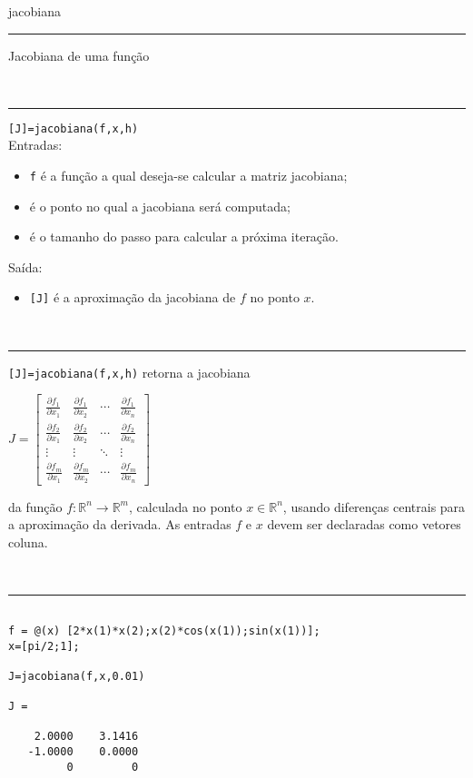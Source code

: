 \documentclass[12pt,a4paper]{article}%
\newcommand{\comando}[1]{{\Large #1} \\ \noindent\rule {17.9cm}{0.05cm}}
\newcommand{\parte}[1]{\vspace{1cm}{\large #1} \\ \noindent\rule {17.9cm}{0.05cm}}
\begin{document}
\comando{jacobiana}

Jacobiana de uma função

\parte{Sintaxe}

\texttt{[J]=jacobiana(f,x,h)}\\

Entradas:

\begin{itemize}
\item \texttt{f} é a função a qual deseja-se calcular a matriz jacobiana;
\item {} é o ponto no qual a jacobiana será computada;
\item {} é o tamanho do passo para calcular a próxima iteração.
\end{itemize}

Saída:

\begin{itemize}
\item \texttt{[J]} é a aproximação da jacobiana de $f$ no ponto $x$. 
\end{itemize}


\parte{Descrição}

\texttt{[J]=jacobiana(f,x,h)} retorna a jacobiana
\begin{center}
$J=%
\begin{bmatrix}
\frac{\partial f_{1}}{\partial x_{1}} & \frac{\partial f_{1}}{\partial x_{2}}
& \cdots  & \frac{\partial f_{1}}{\partial x_{n}} \\ 
\frac{\partial f_{2}}{\partial x_{1}} & \frac{\partial f_{2}}{\partial x_{2}}
& \cdots  & \frac{\partial f_{2}}{\partial x_{n}} \\ 
\vdots  & \vdots  & \ddots  & \vdots  \\ 
\frac{\partial f_{m}}{\partial x_{1}} & \frac{\partial f_{m}}{\partial x_{2}}
& \cdots  & \frac{\partial f_{m}}{\partial x_{n}}%
\end{bmatrix}%
$
\end{center}
da função $f:\mathbb{R}^{n} \rightarrow \mathbb{R}^{m}$, calculada no ponto $x \in \mathbb{R}^{n}$, usando diferenças centrais para a aproximação da derivada. As entradas $f$ e $x$ devem ser declaradas como vetores coluna.

\parte{Exemplo}

\begin{verbatim}

f = @(x) [2*x(1)*x(2);x(2)*cos(x(1));sin(x(1))];
x=[pi/2;1];

J=jacobiana(f,x,0.01)

J =

    2.0000    3.1416
   -1.0000    0.0000
         0         0
\end{verbatim}
\end{document}
